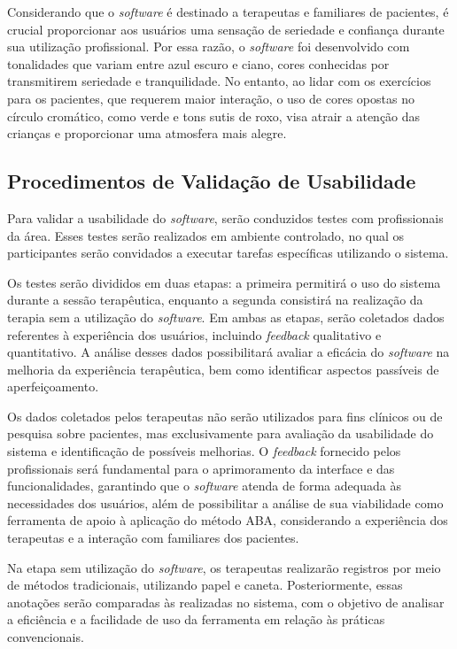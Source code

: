 Considerando que o \textit{software} é destinado a terapeutas e familiares de pacientes, 
é crucial proporcionar aos usuários uma sensação de seriedade e confiança durante sua utilização profissional. 
Por essa razão, o \textit{software} foi desenvolvido com tonalidades que variam entre azul escuro e ciano, 
cores conhecidas por transmitirem seriedade e tranquilidade. 
No entanto, ao lidar com os exercícios para os pacientes, que requerem maior interação, 
o uso de cores opostas no círculo cromático, como verde e tons sutis de roxo, 
visa atrair a atenção das crianças e proporcionar uma atmosfera mais alegre.

\subsection{Procedimentos de Validação de Usabilidade}\label{subsec:validacao_usabilidade}

Para validar a usabilidade do \textit{software}, serão conduzidos testes com profissionais da área. 
Esses testes serão realizados em ambiente controlado, 
no qual os participantes serão convidados a executar tarefas específicas utilizando o sistema.

Os testes serão divididos em duas etapas: a primeira permitirá o uso do sistema durante a sessão terapêutica,
enquanto a segunda consistirá na realização da terapia sem a utilização do \textit{software}. Em ambas as etapas, 
serão coletados dados referentes à experiência dos usuários, incluindo \textit{feedback} qualitativo e quantitativo. 
A análise desses dados possibilitará avaliar a eficácia do \textit{software} na melhoria da experiência terapêutica, 
bem como identificar aspectos passíveis de aperfeiçoamento.

Os dados coletados pelos terapeutas não serão utilizados para fins clínicos ou de pesquisa sobre pacientes, 
mas exclusivamente para avaliação da usabilidade do sistema e identificação de possíveis melhorias. 
O \textit{feedback} fornecido pelos profissionais será fundamental para o aprimoramento da interface e das funcionalidades, 
garantindo que o \textit{software} atenda de forma adequada às necessidades dos usuários, 
além de possibilitar a análise de sua viabilidade como ferramenta de apoio à aplicação do método ABA, 
considerando a experiência dos terapeutas e a interação com familiares dos pacientes.

Na etapa sem utilização do \textit{software}, os terapeutas realizarão registros por meio de métodos tradicionais, 
utilizando papel e caneta. Posteriormente, essas anotações serão comparadas às realizadas no sistema, 
com o objetivo de analisar a eficiência e a facilidade de uso da ferramenta em relação às práticas convencionais.

